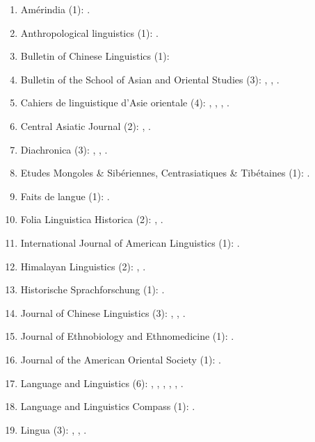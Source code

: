 \documentclass[oneside,a4paper,11pt]{article}
\begin{document}
 \begin{enumerate}
 \item Amérindia (1): \citet{jacques12bear}.
 \item Anthropological linguistics (1): \citet{japhug14ideophones}.
 \item Bulletin of Chinese Linguistics (1): \citet{jacques15derivational.khaling}
 \item Bulletin of the School of Asian and Oriental Studies (3):  \citet{jacques10refl}, \citet{rg-gj12yod}, \citet{jacques13yod}.
 \item Cahiers de linguistique d'Asie orientale (4): \citet{jacques00ywij},  \citet{jacques03dissimilation},   \citet{jacques07chang},  \citet{michaud10bonin}.
 \item Central Asiatic Journal (2):  \citet{jacques10imperial}, \citet{jacques14ergative}.
  \item Diachronica (3): \citet{jacques.michaud11naish}, \citet{michaud-jacques12nasalite}, \citet{jacques16comparative}.
  \item Etudes Mongoles \& Sibériennes, Centrasiatiques \& Tibétaines (1):  \citet{jacques09e}.
  \item Faits de langue (1): \citet{jacques07redupl}.
 \item Folia Linguistica Historica (2): \citet{jacques13arapaho}, \citet{jacques15causative}.
 \item International Journal of American Linguistics (1): \citet{jacques16ebde}.
 \item Himalayan Linguistics (2): \citet{jacques10zos},  \citet{jacques14rtau}.
 \item Historische Sprachforschung (1): \citet{jacques15cochon}.
 \item Journal of Chinese Linguistics (3):   \citet{jacques11tangut.verb}, \citet{jacques15sr}, \citet{jacques16relatives}.
 \item Journal of Ethnobiology and Ethnomedicine (1): \citet{Kang2016}.
 \item Journal of the American Oriental Society (1): \citet{jacques11ngwemi}.
   \item Language and Linguistics (6):  \citet{jacques07passif}, \citet{jacques09tangutverb}, \citet{jacques10inverse},     \citet{jacques11pumi.tone}, \citet{jacques12agreement},    \citet{jacques12khaling}.  
   \item  Language and Linguistics Compass (1): \citet{jacques14inverse}.   
 \item Lingua (3):  \citet{jacques11lingua}, \citet{jacques12incorp}, \citet{jacques14antipassive}.

\end{enumerate}
\end{document}
